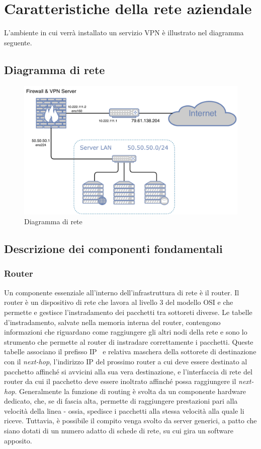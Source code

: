 \section{Caratteristiche della rete aziendale}
L'ambiente in cui verrà installato un servizio VPN è illustrato nel diagramma seguente.
\subsection{Diagramma di rete}
\begin{figure}[h]
    \centering
    \includegraphics[width=14cm]{figure/networkDiagram.pdf}
    \caption{Diagramma di rete}
\end{figure}


\subsection{Descrizione dei componenti fondamentali}
\subsubsection{Router}
Un componente essenziale all'interno dell'infrastruttura di rete è il router. Il router è un dispositivo di rete che lavora al livello 3 del modello OSI e che permette e gestisce l'instradamento dei pacchetti tra sottoreti diverse.
Le tabelle d'instradamento, salvate nella memoria interna del router, contengono informazioni che riguardano come raggiungere gli altri nodi della rete e sono lo strumento che permette al router di instradare correttamente i pacchetti.
Queste tabelle associano il prefisso IP~\cite[RFC0791]{RFC0791} e relativa maschera della sottorete di destinazione con il \emph{next-hop}, l'indirizzo IP del prossimo router a cui deve essere destinato al pacchetto affinché si avvicini alla sua vera destinazione, e l'interfaccia di rete del router da cui il pacchetto deve essere inoltrato affinché possa raggiungere il \emph{next-hop}.
Generalmente la funzione di routing è svolta da un componente hardware dedicato, che, se di fascia alta, permette di raggiungere prestazioni pari alla velocità della linea - ossia, spedisce i pacchetti alla stessa velocità alla quale li riceve.
Tuttavia, è possibile il compito venga svolto da server generici, a patto che siano dotati di un numero adatto di schede di rete, su cui gira un software apposito.


